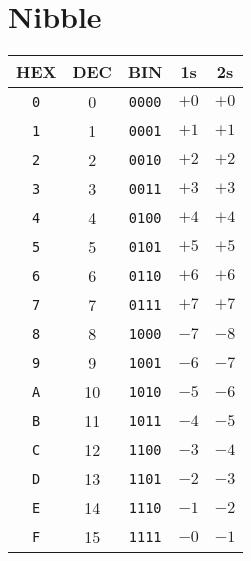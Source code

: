\section*{Nibble}
\centering
\begin{tabular*}{\linewidth}{@{\extracolsep{\fill}}ccccc}
    \toprule
    HEX        & DEC & BIN           & 1s   & 2s   \\
    \midrule
    \texttt{0} & 0   & \texttt{0000} & $+0$ & $+0$ \\
    \texttt{1} & 1   & \texttt{0001} & $+1$ & $+1$ \\
    \texttt{2} & 2   & \texttt{0010} & $+2$ & $+2$ \\
    \texttt{3} & 3   & \texttt{0011} & $+3$ & $+3$ \\
    \texttt{4} & 4   & \texttt{0100} & $+4$ & $+4$ \\
    \texttt{5} & 5   & \texttt{0101} & $+5$ & $+5$ \\
    \texttt{6} & 6   & \texttt{0110} & $+6$ & $+6$ \\
    \texttt{7} & 7   & \texttt{0111} & $+7$ & $+7$ \\
    \texttt{8} & 8   & \texttt{1000} & $-7$ & $-8$ \\
    \texttt{9} & 9   & \texttt{1001} & $-6$ & $-7$ \\
    \texttt{A} & 10  & \texttt{1010} & $-5$ & $-6$ \\
    \texttt{B} & 11  & \texttt{1011} & $-4$ & $-5$ \\
    \texttt{C} & 12  & \texttt{1100} & $-3$ & $-4$ \\
    \texttt{D} & 13  & \texttt{1101} & $-2$ & $-3$ \\
    \texttt{E} & 14  & \texttt{1110} & $-1$ & $-2$ \\
    \texttt{F} & 15  & \texttt{1111} & $-0$ & $-1$ \\
    \bottomrule
\end{tabular*}
